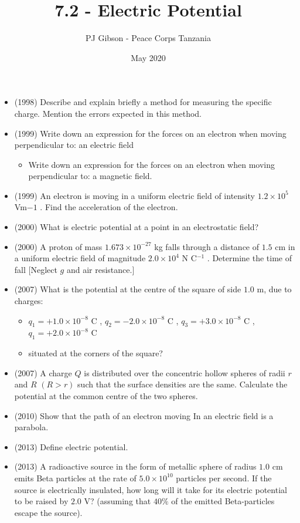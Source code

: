 \documentclass{article}
\title{\textbf{7.2 - Electric Potential}}
\author{PJ Gibson - Peace Corps Tanzania}
\date{May 2020}
\begin{document}
\maketitle

\begin{itemize}
\item (1998)  Describe and explain briefly a method for measuring the specific charge. Mention the errors expected in this method.
\item (1999)  Write down an expression for the forces on an electron when moving perpendicular to: an electric field
 \begin{itemize}
\item Write down an expression for the forces on an electron when moving perpendicular to: a magnetic field.
\end{itemize}
\item (1999)  An electron is moving in a uniform electric field of intensity $ 1.2 \times 10^5$ Vm​ $ -1$ .  Find the acceleration of the electron.
\item (2000)  What is electric potential at a point in an electrostatic field? 
\item (2000)  A proton of mass $ 1.673 \times 10^{-27}$ kg falls through a distance of $ 1.5$ cm in a uniform electric field of magnitude $ 2.0 \times 10^{4}$ N C$ ^{-1}$ . Determine the time of fall [Neglect $ g$ and air resistance.]
\item (2007)  What is the potential at the centre of the square of side $ 1.0$ m, due to charges:
 \begin{itemize}
\item $ q_{1}=+1.0\times10^{-8}$ C , $ q_{2}=-2.0\times10^{-8}$ C , $ q_{3}=+3.0\times10^{-8}$ C , $ q_{1}= +2.0\times10^{-8}$ C
\item situated at the corners of the square?
\end{itemize}
\item (2007)  A charge $ Q$ is distributed over the concentric hollow spheres of radii $ r$ and $ R$ $ (R>r)$ such that the surface densities are the same.  Calculate the potential at the common centre of the two spheres.
\item (2010)  Show that the path of an electron moving In an electric field is a parabola.
\item (2013)  Define electric potential.
\item (2013)  A radioactive source in the form of metallic sphere of radius $ 1.0$ cm emits Beta particles at the rate of $ 5.0 \times 10^{10}$ particles per second.  If the source is electrically insulated, how long will it take for its electric potential to be raised by $ 2.0$ V? (assuming that $ 40\%$ of the emitted Beta-particles escape the source).

\end{itemize}
\end{document}

